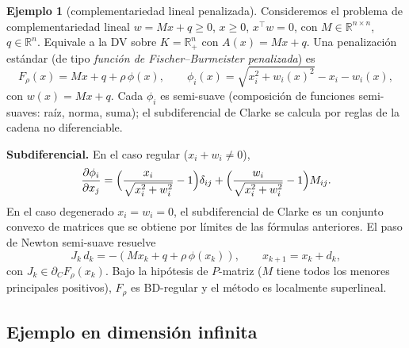 \documentclass[12pt]{book}
\newcommand{\R}{\mathbb{R}}
\newcommand{\subdiff}{\partial}
\theoremstyle{definition}
\newtheorem{ejemplo}{Ejemplo}[section]
\theoremstyle{plain}
\theoremstyle{remark}
\begin{document}
\begin{ejemplo}[complementariedad lineal penalizada]
  Consideremos el problema de complementariedad lineal
  $w=Mx+q\ge0$, $x\ge0$, $x^{\!\top}w=0$, con
  $M\in\R^{n\times n}$, $q\in\R^n$.  Equivale a la DV sobre
  $K=\R^n_+$ con $A(x)=Mx+q$.  Una penalización estándar (de
  tipo \emph{función de Fischer--Burmeister penalizada}) es
  \[
    F_\rho(x)=Mx+q+\rho\,\phi(x),\qquad
    \phi_i(x)=\sqrt{x_i^2+w_i(x)^2}-x_i-w_i(x),
  \]
  con $w(x)=Mx+q$.  Cada $\phi_i$ es semi-suave (composición de
  funciones semi-suaves: raíz, norma, suma); el subdiferencial de
  Clarke se calcula por reglas de la cadena no diferenciable.

  \medskip
  \textbf{Subdiferencial.}  En el caso regular ($x_i+w_i\ne0$),
  \[
    \frac{\partial\phi_i}{\partial x_j}
    =\Bigl(\frac{x_i}{\sqrt{x_i^2+w_i^2}}-1\Bigr)\delta_{ij}
     +\Bigl(\frac{w_i}{\sqrt{x_i^2+w_i^2}}-1\Bigr)M_{ij}.
  \]
  En el caso degenerado $x_i=w_i=0$, el subdiferencial de Clarke
  es un conjunto convexo de matrices que se obtiene por límites de
  las fórmulas anteriores.  El paso de Newton semi-suave resuelve
  \[
    J_k\,d_k=-(Mx_k+q+\rho\,\phi(x_k)),\qquad
    x_{k+1}=x_k+d_k,
  \]
  con $J_k\in\subdiff_C F_\rho(x_k)$.  Bajo la hipótesis de
  $P$-matriz ($M$ tiene todos los menores principales positivos),
  $F_\rho$ es BD-regular y el método es localmente superlineal.
\end{ejemplo}

\subsection{Ejemplo en dimensión infinita}\label{sec:vi-inf}
\end{document}
